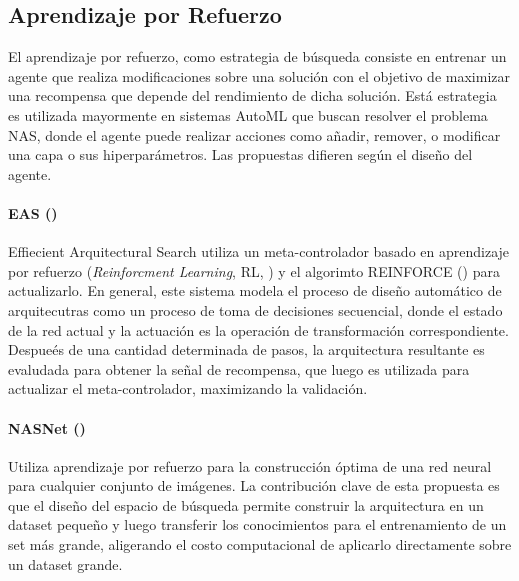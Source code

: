 \subsection{Aprendizaje por Refuerzo}
El aprendizaje por refuerzo, como estrategia de b\'usqueda consiste en entrenar un agente que realiza modificaciones sobre una soluci\'on con el objetivo de maximizar una recompensa que depende del rendimiento de dicha soluci\'on. Est\'a estrategia es utilizada mayormente en sistemas AutoML que buscan resolver el problema NAS, donde el agente puede realizar acciones como a\~nadir, remover, o modificar una capa o sus hiperpar\'ametros. Las propuestas difieren seg\'un el dise\~no del agente.


\paragraph*{EAS (\cite{cai2018efficient})} Effiecient Arquitectural Search utiliza un meta-controlador basado en aprendizaje por refuerzo (\textit{Reinforcment Learning}, RL, \cite{kaelbling1996reinforcement}) y el algorimto REINFORCE (\cite{williams1992simple}) para actualizarlo. En general, este sistema modela el proceso de dise\~no autom\'atico de arquitecutras como un proceso de toma de decisiones secuencial, donde el estado de la red actual y la actuaci\'on es la operaci\'on de transformaci\'on correspondiente. Despue\'es de una cantidad determinada de pasos, la arquitectura resultante es evaludada para obtener la se\~nal de recompensa, que luego es utilizada para actualizar el meta-controlador, maximizando la validaci\'on.

        \paragraph*{NASNet (\cite{zoph2018learning})} Utiliza aprendizaje por refuerzo para la construcci\'on \'optima de una red neural para cualquier conjunto de im\'agenes. La contribuci\'on clave de esta propuesta es que el diseño del espacio de b\'usqueda permite construir la arquitectura en un dataset peque\~no y luego transferir los conocimientos para el entrenamiento de un set m\'as grande, aligerando el costo computacional de aplicarlo directamente sobre un dataset grande.


